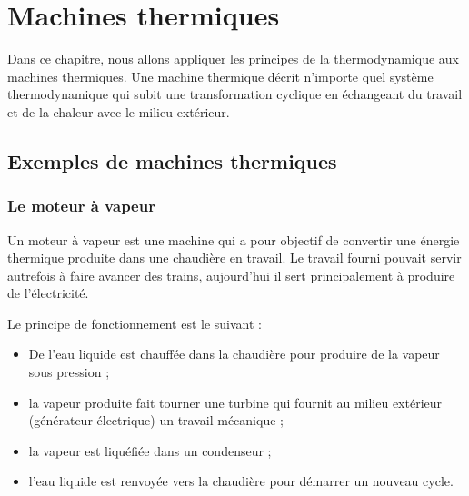 \documentclass{cours}
\begin{document}
\setcounter{chapter}{20}
\chapter{Machines thermiques}

Dans ce chapitre, nous allons appliquer les principes de la thermodynamique aux machines thermiques. Une machine thermique décrit n'importe quel système thermodynamique qui subit une transformation cyclique en échangeant du travail et de la chaleur avec le milieu extérieur.


\section{Exemples de machines thermiques}%
\label{sec:exemples_de_machines_thermiques}

\subsection{Le moteur à vapeur}%
\label{sub:le_moteur_a_vapeur}
Un moteur à vapeur est une machine qui a pour objectif de convertir une énergie thermique produite dans une chaudière en travail. Le travail fourni pouvait servir autrefois à faire avancer des trains, aujourd'hui il sert principalement à produire de l'électricité.

Le principe de fonctionnement est le suivant :
\begin{itemize}
  \item De l'eau liquide est chauffée dans la chaudière pour produire de la vapeur sous pression ;
  \item la vapeur produite fait tourner une turbine qui fournit au milieu extérieur (générateur électrique) un travail mécanique ;
  \item la vapeur est liquéfiée dans un condenseur ;
  \item l'eau liquide est renvoyée vers la chaudière pour démarrer un nouveau cycle.
\end{itemize}
\end{document}
